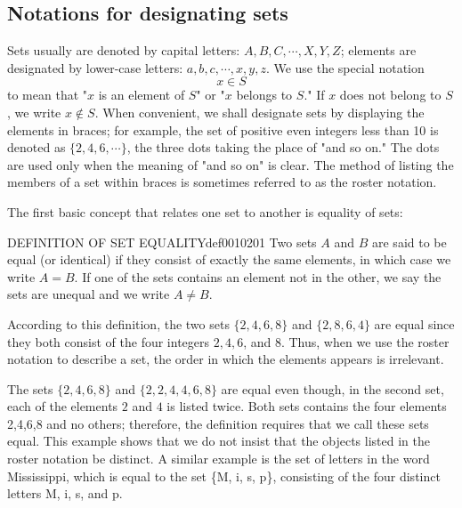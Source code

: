 \documentclass[cn,11pt,chinese]{elegantbook}
\numberwithin{equation}{section}
\begin{document}
\subsection{Notations for designating sets}
Sets usually are denoted by capital letters: $A,B,C,\cdots,X,Y,Z$; elements are designated by lower-case letters: $a,b,c,\cdots,x,y,z$. We use the special notation
\[
x \in S
\]
to mean that "$x$ is an element of $S$" or "$x$ belongs to $S$." If $x$ does not belong to $S$, we write $x \notin S$. When convenient, we shall designate sets by displaying the elements in braces; for example, the set of positive even integers less than 10 is denoted as $\{2, 4, 6, \cdots\}$, the three dots taking the place of "and so on." The dots are used only when the meaning of "and so on" is clear. The method of listing the members of a set within braces is sometimes referred to as the roster notation.

The first basic concept that relates one set to another is equality of sets: 
\begin{definition}{DEFINITION OF SET EQUALITY}{def0010201}
Two sets $A$ and $B$ are said to be equal (or identical) if they consist of exactly the same elements, in which case we write $A = B$. If one of the sets contains an element not in the other, we say the sets are unequal and we write $A \neq B$.
\end{definition}

\begin{example}
According to this definition, the two sets $\{2,4,6,8\}$ and $\{2,8,6,4\}$ are equal since they both consist of the four integers $2,4,6$, and 8. Thus, when we use the roster notation to describe a set, the order in which the elements appears is irrelevant.
\end{example}

\begin{example}
The sets $\{2,4,6,8\}$ and $\{2,2,4,4,6,8\}$ are equal even though, in the second set, each of the elements $2$ and $4$ is listed twice. Both sets contains the four elements 2,4,6,8 and no others; therefore, the definition requires that we call these sets equal. This example shows that we do not insist that the objects listed in the roster notation be distinct. A similar example is the set of letters in the word Mississippi, which is equal to the set \{M, i, s, p\}, consisting of the four distinct letters M, i, s, and p.
\end{example}
\end{document}
